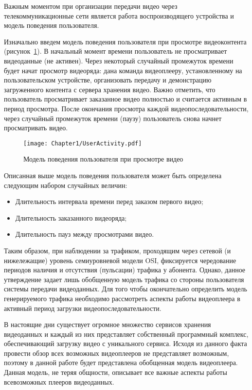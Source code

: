 Важным моментом при организации передачи видео через телекоммуникационные сети является работа воспроизводящего устройства и модель поведения пользователя.

Изначально введем модель поведения пользователя при просмотре видеоконтента (рисунок~\ref{fig:UserActivity}). В начальный момент времени пользователь не просматривает видеоданные (не активен). Через некоторый случайный промежуток времени будет начат просмотр видеоряда: дана команда видеоплееру, установленному на пользовательском устройстве, организовать передачу и демонстрацию загруженного контента с сервера хранения видео. Важно отметить, что пользователь просматривает заказанное видео полностью и считается активным в период просмотра. После окончания просмотра каждой видеопоследовательности, через случайный промежуток времени (паузу) пользователь снова начнет просматривать видео.

\begin{figure}[htbp]
\begin{center}
\texttt{[image: Chapter1/UserActivity.pdf]}
\caption{Модель поведения пользователя при просмотре видео}
\label{fig:UserActivity}
\end{center}
\end{figure}

Описанная выше модель поведения пользователя может быть определена следующим набором случайных величин:
\begin{itemize}
  \item Длительность интервала времени перед заказом первого видео;
  \item Длительность заказанного видеоряда;
  \item Длительность пауз между просмотрами видео.
\end{itemize}

Таким образом, при наблюдении за трафиком, проходящим через сетевой (и нижележащие) уровень семиуровневой модели OSI, фиксируется чередование периодов наличия и отсутствия (пульсации) трафика у абонента. Однако, данное утверждение задает лишь обобщенную модель трафика со стороны пользователя системы передачи видеоданных. Для того чтобы окончательно определить модель генерируемого трафика необходимо рассмотреть аспекты работы видеоплеера в активный период загрузки видеопоследовательности.

В настоящие дни существует огромное множество сервисов хранения видеоданных и каждый из них представляет собственный программный комплекс, обеспечивающий загрузку видео с уникального сервиса. Исходя из данного факта провести обзор всех возможных видеоплееров не представляет возможным, поэтому в данной работе будет представлена обобщенная модель видеоплеера. Данная модель, не теряя общности, описывает все важные аспекты работы всевозможных плееров видеоданных.

